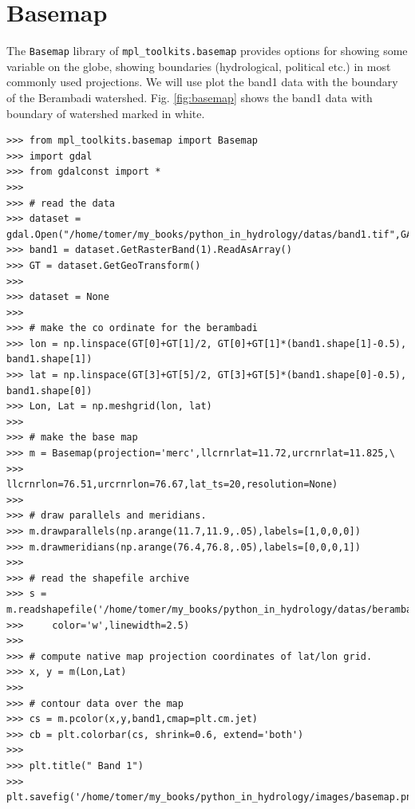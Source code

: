 \documentclass[10pt]{book}
\begin{document}
{\section{Basemap}
The \verb"Basemap" library of \verb"mpl_toolkits.basemap" provides options for showing some variable on the globe, showing boundaries (hydrological, political etc.) in most commonly used projections. We will use plot the band1 data with the boundary of the Berambadi watershed. Fig. \ref{fig:basemap} shows the band1 data with boundary of watershed marked in white. 
\beforeverb \begin{verbatim}
>>> from mpl_toolkits.basemap import Basemap
>>> import gdal
>>> from gdalconst import *
>>> 
>>> # read the data
>>> dataset = gdal.Open("/home/tomer/my_books/python_in_hydrology/datas/band1.tif",GA_ReadOnly)
>>> band1 = dataset.GetRasterBand(1).ReadAsArray()
>>> GT = dataset.GetGeoTransform()
>>> 
>>> dataset = None
>>> 
>>> # make the co ordinate for the berambadi
>>> lon = np.linspace(GT[0]+GT[1]/2, GT[0]+GT[1]*(band1.shape[1]-0.5), band1.shape[1])
>>> lat = np.linspace(GT[3]+GT[5]/2, GT[3]+GT[5]*(band1.shape[0]-0.5), band1.shape[0])
>>> Lon, Lat = np.meshgrid(lon, lat)
>>> 
>>> # make the base map
>>> m = Basemap(projection='merc',llcrnrlat=11.72,urcrnrlat=11.825,\
>>>             llcrnrlon=76.51,urcrnrlon=76.67,lat_ts=20,resolution=None)
>>> 
>>> # draw parallels and meridians.
>>> m.drawparallels(np.arange(11.7,11.9,.05),labels=[1,0,0,0])
>>> m.drawmeridians(np.arange(76.4,76.8,.05),labels=[0,0,0,1])
>>> 
>>> # read the shapefile archive
>>> s = m.readshapefile('/home/tomer/my_books/python_in_hydrology/datas/berambadi','berambadi',
>>>     color='w',linewidth=2.5)
>>> 
>>> # compute native map projection coordinates of lat/lon grid.
>>> x, y = m(Lon,Lat)
>>> 
>>> # contour data over the map
>>> cs = m.pcolor(x,y,band1,cmap=plt.cm.jet)
>>> cb = plt.colorbar(cs, shrink=0.6, extend='both')
>>> 
>>> plt.title(" Band 1")
>>> plt.savefig('/home/tomer/my_books/python_in_hydrology/images/basemap.png')
\end{verbatim} \afterverb

}
\end{document}
